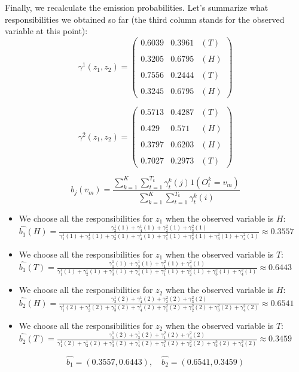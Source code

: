 \documentclass[11pt,a4paper]{article}
\begin{document}
	Finally, we recalculate the emission probabilities. Let's summarize what responsibilities we obtained so far (the third column stands for the observed variable at this point):
	$$ \gamma^1(z_1, z_2) = \left(\begin{smallmatrix} 0.6039 & 0.3961 & (T) \\ \\ 0.3205 & 0.6795 & (H) \\ \\ 0.7556 & 0.2444 & (T) \\ \\ 0.3245 & 0.6795 & (H) \end{smallmatrix} \right)  $$
	
	$$ \gamma^2(z_1, z_2) = \left(\begin{smallmatrix} 0.5713 & 0.4287 & (T) \\ \\ 0.429 & 0.571 & (H) \\ \\ 0.3797 & 0.6203 & (H) \\ \\ 0.7027 & 0.2973 & (T) \end{smallmatrix} \right)  $$
	
	$$ b_j(v_m) = \frac{\sum_{k=1}^K \sum_{t = 1}^{T_k}  \gamma_t^k(j) 1(O_t^k = v_m) }{ \sum_{k=1}^K \sum_{t = 1}^{T_k}  \gamma_t^k(i) } $$
	
	
	\begin{itemize}
		\item We choose all the responsibilities for $z_1$ when the observed variable is $H$: \\
		$ \widehat{b_1}(H) = \frac{\gamma_2^1(1) + \gamma_4^1(1) + \gamma_2^2(1) + \gamma_3^2(1)}{ \gamma_1^1(1) + \gamma_2^1(1) + \gamma_3^1(1)  + \gamma_4^1(1) + \gamma_1^2(1) + \gamma_2^2(1) + \gamma_3^2(1) + \gamma_4^2(1) } \approx 0.3557$
		
		\item We choose all the responsibilities for $z_1$ when the observed variable is $T$: \\
		$ \widehat{b_1}(T) = \frac{\gamma_1^1(1) + \gamma_3^1(1) + \gamma_1^2(1) + \gamma_4^2(1)}{ \gamma_1^1(1) + \gamma_2^1(1) + \gamma_3^1(1)  + \gamma_4^1(1) + \gamma_1^2(1) + \gamma_2^2(1) + \gamma_3^2(1) + \gamma_4^2(1) } \approx 0.6443$
		
		\item We choose all the responsibilities for $z_2$ when the observed variable is $H$: \\
		$ \widehat{b_2}(H) = \frac{\gamma_2^1(2) + \gamma_4^1(2) + \gamma_2^2(2) + \gamma_3^2(2)}{ \gamma_1^1(2) + \gamma_2^1(2) + \gamma_3^1(2)  + \gamma_4^1(2) + \gamma_1^2(2) + \gamma_2^2(2) + \gamma_3^2(2) + \gamma_4^2(2) } \approx 0.6541$
		
		\item We choose all the responsibilities for $z_2$ when the observed variable is $T$: \\
		$ \widehat{b_2}(T) = \frac{\gamma_1^1(2) + \gamma_3^1(2) + \gamma_1^2(2) + \gamma_4^2(2)}{ \gamma_1^1(2) + \gamma_2^1(2) + \gamma_3^1(2)  + \gamma_4^1(2) + \gamma_1^2(2) + \gamma_2^2(2) + \gamma_3^2(2) + \gamma_4^2(2) } \approx 0.3459$
	\end{itemize}
	
	$$ \widehat{b_1} = (0.3557, 0.6443), \quad  \widehat{b_2} = (0.6541, 0.3459)$$
	
	
\end{document}

